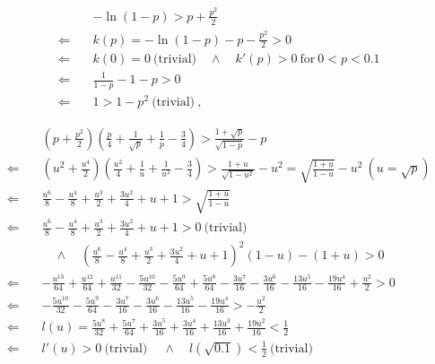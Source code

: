 \documentclass[]{article}
\begin{document}
\begin{align*}
&-\ln(1-p) > p + \frac{p^2}{2}\\
\Longleftarrow\quad& k(p) = -\ln(1-p) - p - \frac{p^2}{2} > 0\\
\Longleftarrow\quad& k(0) = 0 \ \mbox{(trivial)} \quad\wedge\quad k'(p) > 0 \ \mbox{for}\ 0 < p < 0.1\\
 \Longleftarrow\quad& \frac{1}{1 - p} - 1 - p > 0\\
  \Longleftarrow\quad& 1 > 1 - p^2  \ \mbox{(trivial)} \ ,
\end{align*}

\begin{align*}
&\left(p + \frac{p^2}{2}\right) \left(\frac{p}{4}+\frac{1}{\sqrt{p}}+\frac{1}{p}-\frac{3}{4}\right) > \frac{1 + \sqrt{p}}{\sqrt{1-p}} - p\\
\Longleftarrow\quad&\left(u^2 + \frac{u^4}{2}\right) \left(\frac{u^2}{4}+\frac{1}{u}+\frac{1}{u^2}-\frac{3}{4}\right) > \frac{1 + u}{\sqrt{1-u^2}} - u^2 = \sqrt{\frac{1 + u}{1-u}} - u^2\ (u = \sqrt{p})\\
\Longleftarrow\quad&\frac{u^6}{8}-\frac{u^4}{8}+\frac{u^3}{2}+\frac{3u^2}{4}+u+1 >\sqrt{\frac{1 + u}{1-u}}\\
\Longleftarrow\quad&   \frac{u^6}{8}-\frac{u^4}{8}+\frac{u^3}{2}+\frac{3u^2}{4}+u+1  > 0   \ \mbox{(trivial)} \\&\quad\wedge\quad  \left(\frac{u^6}{8}-\frac{u^4}{8}+\frac{u^3}{2}+\frac{3u^2}{4}+u+1 \right)^2(1-u)-(1+u) > 0\\
\Longleftarrow\quad&-\frac{u^{13}}{64}+\frac{u^{12}}{64}+\frac{u^{11}}{32}-\frac{5u^{10}}{32}-\frac{5u^9}{64}+\frac{5u^8}{64}-\frac{3u^7}{16}-\frac{3u^6}{16}-\frac{13u^5}{16} - \frac{19u^4}{16}+\frac{u^2}{2} > 0\\
\Longleftarrow\quad&-\frac{5u^{10}}{32}-\frac{5u^9}{64}-\frac{3u^7}{16}-\frac{3u^6}{16}-\frac{13u^5}{16} - \frac{19u^4}{16} > -\frac{u^2}{2}\\
\Longleftarrow\quad&l(u) = \frac{5u^{8}}{32}+\frac{5u^7}{64}+\frac{3u^5}{16}+\frac{3u^4}{16}+\frac{13u^3}{16} + \frac{19u^2}{16} < \frac{1}{2}\\
\Longleftarrow\quad&l'(u) > 0\ \mbox{(trivial)} \ \quad\wedge\quad l(\sqrt{0.1}) < \frac{1}{2}\ \mbox{(trivial)}
\end{align*}
\end{document}
